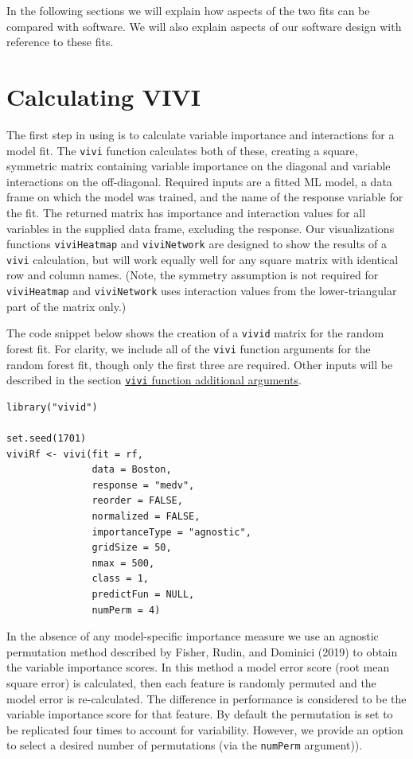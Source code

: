 In the following sections we will explain how aspects of the two fits can be compared with  software. We will also explain aspects of our software design with reference to these fits.

\hypertarget{data}{%
\section{Calculating VIVI}\label{data}}

The first step in using  is to calculate variable importance and interactions for a model fit.
The \texttt{vivi} function calculates both of these, creating a square, symmetric matrix containing variable importance on the diagonal and variable interactions on the off-diagonal. Required inputs are a fitted ML model, a data frame on which the model was trained, and the name of the response variable for the fit. The returned matrix has importance and interaction values for all variables in the supplied data frame, excluding the response. Our visualizations functions \texttt{viviHeatmap} and \texttt{viviNetwork} are designed to show the results of a \texttt{vivi} calculation, but will work equally well for any square matrix with identical row and column names. (Note, the symmetry assumption is not required for \texttt{viviHeatmap} and \texttt{viviNetwork} uses interaction values from the lower-triangular part of the matrix only.)

The code snippet below shows the creation of a \texttt{vivid} matrix for the random forest fit. For clarity, we include all of the \texttt{vivi} function arguments for the random forest fit, though only the first three are required. Other inputs will be described in the section \protect\hyperlink{sec:vivimatarg}{\texttt{vivi} function additional arguments}.

\begin{verbatim}
library("vivid")

set.seed(1701)
viviRf <- vivi(fit = rf,
               data = Boston,
               response = "medv",
               reorder = FALSE,
               normalized = FALSE,
               importanceType = "agnostic",
               gridSize = 50,
               nmax = 500,
               class = 1,
               predictFun = NULL,
               numPerm = 4)
\end{verbatim}

In the absence of any model-specific importance measure we use an agnostic permutation method described by Fisher, Rudin, and Dominici (2019) to obtain the variable importance scores. In this method a model error score (root mean square error) is calculated, then each feature is randomly permuted and the model error is re-calculated. The difference in performance is considered to be the variable importance score for that feature. By default the permutation is set to be replicated four times to account for variability. However, we provide an option to select a desired number of permutations (via the \texttt{numPerm} argument)).

